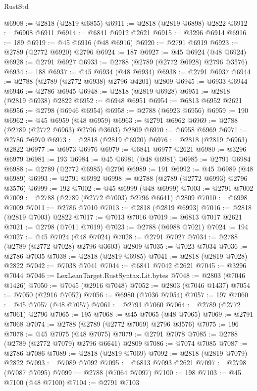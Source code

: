 \begin{lexlean}{RustStd}
\begin{coremodule}
@6908 := @2818 (@2819 @6855)
@6911 := @2818 (@2819 @6898) @2822
@6912 := @6908 @6911
@6914 := @6841 @6912 @2621
@6915 := @3296 @6914
@6916 := 189
@6919 := @45 @6916 (@48 @6916)
@6920 := @2791 @6919
@6923 := @2789 (@2772 @6920) @2796
@6924 := 187
@6927 := @45 @6924 (@48 @6924)
@6928 := @2791 @6927
@6933 := @2788 (@2789 (@2772 @6928) @2796 @3576)
@6934 := 188
@6937 := @45 @6934 (@48 @6934)
@6938 := @2791 @6937
@6944 := @2788 (@2789 (@2772 @6938) @2796 @4201) @2809
@6945 := @6933 @6944
@6946 := @2786 @6945
@6948 := @2818 (@2819 @6928)
@6951 := @2818 (@2819 @6938) @2822
@6952 := @6948 @6951
@6954 := @6813 @6952 @2621
@6956 := @2798 (@6946 @6954)
@6958 := @2788 (@6923 @6956)
@6959 := 190
@6962 := @45 @6959 (@48 @6959)
@6963 := @2791 @6962
@6969 := @2788 (@2789 (@2772 @6963) @2796 @3603) @2809
@6970 := @6958 @6969
@6971 := @2786 @6970
@6973 := @2818 (@2819 @6920)
@6976 := @2818 (@2819 @6963) @2822
@6977 := @6973 @6976
@6979 := @6841 @6977 @2621
@6980 := @3296 @6979
@6981 := 193
@6984 := @45 @6981 (@48 @6981)
@6985 := @2791 @6984
@6988 := @2789 (@2772 @6985) @2796
@6989 := 191
@6992 := @45 @6989 (@48 @6989)
@6993 := @2791 @6992
@6998 := @2788 (@2789 (@2772 @6993) @2796 @3576)
@6999 := 192
@7002 := @45 @6999 (@48 @6999)
@7003 := @2791 @7002
@7009 := @2788 (@2789 (@2772 @7003) @2796 @6641) @2809
@7010 := @6998 @7009
@7011 := @2786 @7010
@7013 := @2818 (@2819 @6993)
@7016 := @2818 (@2819 @7003) @2822
@7017 := @7013 @7016
@7019 := @6813 @7017 @2621
@7021 := @2798 (@7011 @7019)
@7023 := @2788 (@6988 @7021)
@7024 := 194
@7027 := @45 @7024 (@48 @7024)
@7028 := @2791 @7027
@7034 := @2788 (@2789 (@2772 @7028) @2796 @3603) @2809
@7035 := @7023 @7034
@7036 := @2786 @7035
@7038 := @2818 (@2819 @6985)
@7041 := @2818 (@2819 @7028) @2822
@7042 := @7038 @7041
@7044 := @6841 @7042 @2621
@7045 := @3296 @7044
@7046 := LexLeanTarget.RustSyntax.Lit.bytes
@7048 := @2803 (@7046 @1426)
@7050 := @7045 (@2916 @7048)
@7052 := @2803 (@7046 @1437)
@7054 := @7050 (@2916 @7052)
@7056 := @6980 (@7036 @7054)
@7057 := 197
@7060 := @45 @7057 (@48 @7057)
@7061 := @2791 @7060
@7064 := @2789 (@2772 @7061) @2796
@7065 := 195
@7068 := @45 @7065 (@48 @7065)
@7069 := @2791 @7068
@7074 := @2788 (@2789 (@2772 @7069) @2796 @3576)
@7075 := 196
@7078 := @45 @7075 (@48 @7075)
@7079 := @2791 @7078
@7085 := @2788 (@2789 (@2772 @7079) @2796 @6641) @2809
@7086 := @7074 @7085
@7087 := @2786 @7086
@7089 := @2818 (@2819 @7069)
@7092 := @2818 (@2819 @7079) @2822
@7093 := @7089 @7092
@7095 := @6813 @7093 @2621
@7097 := @2798 (@7087 @7095)
@7099 := @2788 (@7064 @7097)
@7100 := 198
@7103 := @45 @7100 (@48 @7100)
@7104 := @2791 @7103

\end{coremodule}
\end{lexlean}

